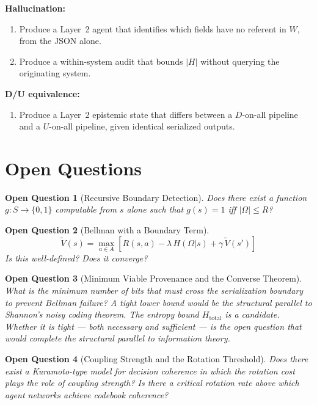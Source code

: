 \documentclass[11pt,a4paper]{article}
\newtheorem{question}{Open Question}
\begin{document}
\textbf{Hallucination:}
\begin{enumerate}[resume]
  \item Produce a Layer~2 agent that identifies which fields have no 
  referent in $W$, from the JSON alone.
  \item Produce a within-system audit that bounds $|H|$ without 
  querying the originating system.
\end{enumerate}

\textbf{D/U equivalence:}
\begin{enumerate}[resume]
  \item Produce a Layer~2 epistemic state that differs between a 
  $D$-on-all pipeline and a $U$-on-all pipeline, given identical 
  serialized outputs.
\end{enumerate}


\section{Open Questions}
\label{sec:open}

\begin{question}[Recursive Boundary Detection]
Does there exist a function $g: S \to \{0, 1\}$ computable from $s$ 
alone such that $g(s) = 1$ iff $|\Omega| \leq R$?
\end{question}

\begin{question}[Bellman with a Boundary Term]
\[
\tilde{V}(s) = \max_{a \in A} \left[ R(s, a) - \lambda\, 
H(\Omega | s) + \gamma\, \tilde{V}(s') \right]
\]
Is this well-defined? Does it converge?
\end{question}

\begin{question}[Minimum Viable Provenance and the Converse Theorem]
What is the minimum number of bits that must cross the serialization 
boundary to prevent Bellman failure? A tight lower bound would be the 
structural parallel to Shannon's noisy coding theorem. The entropy 
bound $H_{\text{total}}$ is a candidate. Whether it is tight --- 
both necessary and sufficient --- is the open question that would 
complete the structural parallel to information theory.
\end{question}

\begin{question}[Coupling Strength and the Rotation Threshold]
Does there exist a Kuramoto-type model for decision coherence in 
which the rotation cost plays the role of coupling strength? Is there 
a critical rotation rate above which agent networks achieve codebook 
coherence?
\end{question}
\end{document}
